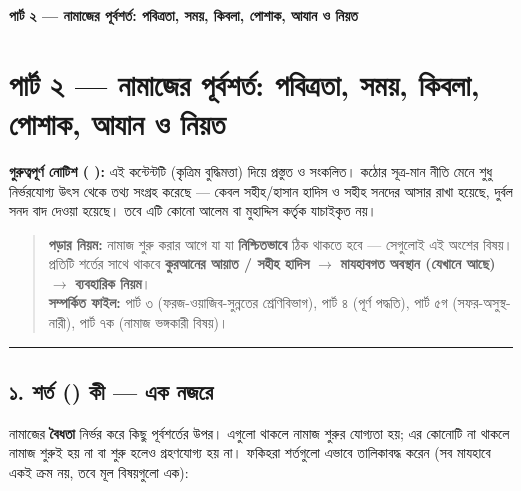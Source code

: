 

\begin{center}{\Large\bfseries\color{emerald} পার্ট ২ — নামাজের পূর্বশর্ত: পবিত্রতা, সময়, কিবলা, পোশাক, আযান ও নিয়ত}\end{center}
\vspace{1em}
\section*{পার্ট ২ — নামাজের পূর্বশর্ত: পবিত্রতা, সময়, কিবলা, পোশাক, আযান ও নিয়ত}

\begin{warnbox}
 \textbf{গুরুত্বপূর্ণ নোটিশ ( ):} এই কন্টেন্টটি  (কৃত্রিম বুদ্ধিমত্তা) দিয়ে প্রস্তুত ও সংকলিত।  কঠোর সূত্র-মান নীতি মেনে শুধু নির্ভরযোগ্য উৎস থেকে তথ্য সংগ্রহ করেছে — কেবল সহীহ/হাসান হাদিস ও সহীহ সনদের আসার রাখা হয়েছে, দুর্বল সনদ বাদ দেওয়া হয়েছে। তবে এটি কোনো আলেম বা মুহাদ্দিস কর্তৃক যাচাইকৃত নয়।
\end{warnbox}

\begin{quote}
\textbf{পড়ার নিয়ম:} নামাজ শুরু করার আগে যা যা \textbf{নিশ্চিতভাবে} ঠিক থাকতে হবে — সেগুলোই এই অংশের বিষয়। প্রতিটি শর্তের সাথে থাকবে \textbf{কুরআনের আয়াত / সহীহ হাদিস} $\rightarrow$ \textbf{মাযহাবগত অবস্থান (যেখানে আছে)} $\rightarrow$ \textbf{ব্যবহারিক নিয়ম}। \\
\textbf{সম্পর্কিত ফাইল:} পার্ট ৩ (ফরজ-ওয়াজিব-সুন্নতের শ্রেণিবিভাগ), পার্ট ৪ (পূর্ণ পদ্ধতি), পার্ট ৫গ (সফর-অসুস্থ-নারী), পার্ট ৭ক (নামাজ ভঙ্গকারী বিষয়)।
\end{quote}

\medskip\hrule\medskip

\subsection*{১. শর্ত () কী — এক নজরে}

নামাজের \textbf{বৈধতা} নির্ভর করে কিছু পূর্বশর্তের উপর। এগুলো থাকলে নামাজ শুরুর যোগ্যতা হয়; এর কোনোটি না থাকলে নামাজ শুরুই হয় না বা শুরু হলেও গ্রহণযোগ্য হয় না। ফকিহরা শর্তগুলো এভাবে তালিকাবদ্ধ করেন (সব মাযহাবে একই ক্রম নয়, তবে মূল বিষয়গুলো এক):

